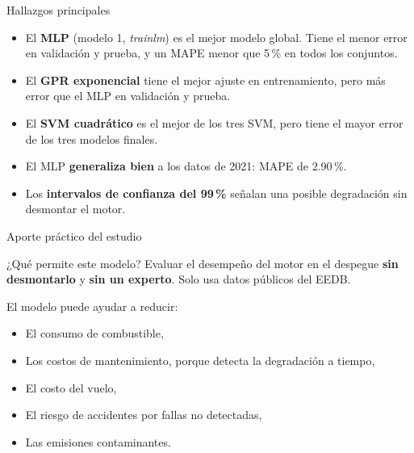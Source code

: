 \documentclass{beamer}
\begin{document}
\begin{frame}{Hallazgos principales}
    \justifying
    \begin{itemize}
        \item El \textbf{MLP} (modelo 1, \textit{trainlm}) es el mejor modelo global. Tiene el menor error en validación y prueba, y un MAPE menor que 5\,\% en todos los conjuntos.
        \item El \textbf{GPR exponencial} tiene el mejor ajuste en entrenamiento, pero más error que el MLP en validación y prueba.
        \item El \textbf{SVM cuadrático} es el mejor de los tres SVM, pero tiene el mayor error de los tres modelos finales.
        \item El MLP \textbf{generaliza bien} a los datos de 2021: MAPE de 2.90\,\%.
        \item Los \textbf{intervalos de confianza del 99\,\%} señalan una posible degradación sin desmontar el motor.
    \end{itemize}
\end{frame}

\begin{frame}{Aporte práctico del estudio}
    \justifying
    \begin{block}{¿Qué permite este modelo?}
        Evaluar el desempeño del motor en el despegue \textbf{sin desmontarlo} y \textbf{sin un experto}. Solo usa datos públicos del EEDB.
    \end{block}
    \bigskip
    El modelo puede ayudar a reducir:
    \begin{itemize}
        \item El consumo de combustible,
        \item Los costos de mantenimiento, porque detecta la degradación a tiempo,
        \item El costo del vuelo,
        \item El riesgo de accidentes por fallas no detectadas,
        \item Las emisiones contaminantes.
    \end{itemize}
\end{frame}
\end{document}
